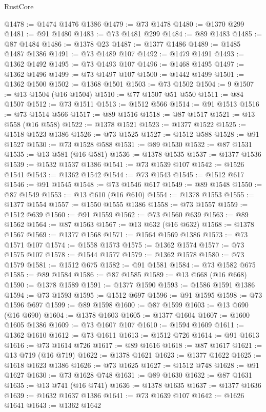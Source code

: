 \begin{lexlean}{RustCore}
\begin{coremodule}
@1478 := @1474 @1476 @1386
@1479 := @73 @1478
@1480 := @1370 @299
@1481 := @91 @1480
@1483 := @73 @1481 @299
@1484 := @89 @1483
@1485 := @87 @1484
@1486 := @1378 @23
@1487 := @1377 @1486
@1489 := @1485 @1487 @1386
@1491 := @73 @1489 @107
@1492 := @1479 @1491
@1493 := @1362 @1492
@1495 := @73 @1493 @107
@1496 := @1468 @1495
@1497 := @1362 @1496
@1499 := @73 @1497 @107
@1500 := @1442 @1499
@1501 := @1362 @1500
@1502 := @1368 @1501
@1503 := @73 @1502
@1504 := 9
@1507 := @13 @1504 (@16 @1504)
@1510 := @77 @1507 @51 @550
@1511 := @84 @1507
@1512 := @73 @1511
@1513 := @1512 @566
@1514 := @91 @1513
@1516 := @73 @1514 @566
@1517 := @89 @1516
@1518 := @87 @1517
@1521 := @13 @558 (@16 @558)
@1522 := @1378 @1521
@1523 := @1377 @1522
@1525 := @1518 @1523 @1386
@1526 := @73 @1525
@1527 := @1512 @588
@1528 := @91 @1527
@1530 := @73 @1528 @588
@1531 := @89 @1530
@1532 := @87 @1531
@1535 := @13 @581 (@16 @581)
@1536 := @1378 @1535
@1537 := @1377 @1536
@1539 := @1532 @1537 @1386
@1541 := @73 @1539 @107
@1542 := @1526 @1541
@1543 := @1362 @1542
@1544 := @73 @1543
@1545 := @1512 @617
@1546 := @91 @1545
@1548 := @73 @1546 @617
@1549 := @89 @1548
@1550 := @87 @1549
@1553 := @13 @610 (@16 @610)
@1554 := @1378 @1553
@1555 := @1377 @1554
@1557 := @1550 @1555 @1386
@1558 := @73 @1557
@1559 := @1512 @639
@1560 := @91 @1559
@1562 := @73 @1560 @639
@1563 := @89 @1562
@1564 := @87 @1563
@1567 := @13 @632 (@16 @632)
@1568 := @1378 @1567
@1569 := @1377 @1568
@1571 := @1564 @1569 @1386
@1573 := @73 @1571 @107
@1574 := @1558 @1573
@1575 := @1362 @1574
@1577 := @73 @1575 @107
@1578 := @1544 @1577
@1579 := @1362 @1578
@1580 := @73 @1579
@1581 := @1512 @675
@1582 := @91 @1581
@1584 := @73 @1582 @675
@1585 := @89 @1584
@1586 := @87 @1585
@1589 := @13 @668 (@16 @668)
@1590 := @1378 @1589
@1591 := @1377 @1590
@1593 := @1586 @1591 @1386
@1594 := @73 @1593
@1595 := @1512 @697
@1596 := @91 @1595
@1598 := @73 @1596 @697
@1599 := @89 @1598
@1600 := @87 @1599
@1603 := @13 @690 (@16 @690)
@1604 := @1378 @1603
@1605 := @1377 @1604
@1607 := @1600 @1605 @1386
@1609 := @73 @1607 @107
@1610 := @1594 @1609
@1611 := @1362 @1610
@1612 := @73 @1611
@1613 := @1512 @726
@1614 := @91 @1613
@1616 := @73 @1614 @726
@1617 := @89 @1616
@1618 := @87 @1617
@1621 := @13 @719 (@16 @719)
@1622 := @1378 @1621
@1623 := @1377 @1622
@1625 := @1618 @1623 @1386
@1626 := @73 @1625
@1627 := @1512 @748
@1628 := @91 @1627
@1630 := @73 @1628 @748
@1631 := @89 @1630
@1632 := @87 @1631
@1635 := @13 @741 (@16 @741)
@1636 := @1378 @1635
@1637 := @1377 @1636
@1639 := @1632 @1637 @1386
@1641 := @73 @1639 @107
@1642 := @1626 @1641
@1643 := @1362 @1642

\end{coremodule}
\end{lexlean}
